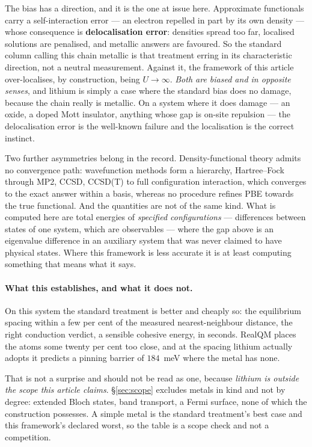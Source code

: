 \documentclass[11pt]{article}
\begin{document}
The bias has a direction, and it is the one at issue here. Approximate functionals carry a
self-interaction error --- an electron repelled in part by its own density --- whose consequence is
\textbf{delocalisation error}: densities spread too far, localised solutions are penalised, and
metallic answers are favoured. So the standard column calling this chain metallic is that treatment
erring in its characteristic direction, not a neutral measurement. Against it, the framework of this
article over-localises, by construction, being $U\to\infty$. \emph{Both are biased and in opposite
senses}, and lithium is simply a case where the standard bias does no damage, because the chain
really is metallic. On a system where it does damage --- an oxide, a doped Mott insulator, anything
whose gap is on-site repulsion --- the delocalisation error is the well-known failure and the
localisation is the correct instinct.

Two further asymmetries belong in the record. Density-functional theory admits no convergence path:
wavefunction methods form a hierarchy, Hartree--Fock through MP2, CCSD, CCSD(T) to full
configuration interaction, which converges to the exact answer within a basis, whereas no procedure
refines PBE towards the true functional. And the quantities are not of the same kind. What is
computed here are total energies of \emph{specified configurations} --- differences between states
of one system, which are observables --- where the gap above is an eigenvalue difference in an
auxiliary system that was never claimed to have physical states. Where this framework is less
accurate it is at least computing something that means what it says.

\paragraph{What this establishes, and what it does not.} On this system the standard treatment is
better and cheaply so: the equilibrium spacing within a few per cent of the measured
nearest-neighbour distance, the right conduction verdict, a sensible cohesive energy, in seconds.
RealQM places the atoms some twenty per cent too close, and at the spacing lithium actually adopts
it predicts a pinning barrier of $184$~meV where the metal has none.

That is not a surprise and should not be read as one, because \emph{lithium is outside the scope
this article claims}. \S\ref{sec:scope} excludes metals in kind and not by degree: extended Bloch
states, band transport, a Fermi surface, none of which the construction possesses. A simple metal is
the standard treatment's best case and this framework's declared worst, so the table is a scope check
and not a competition.
\end{document}
